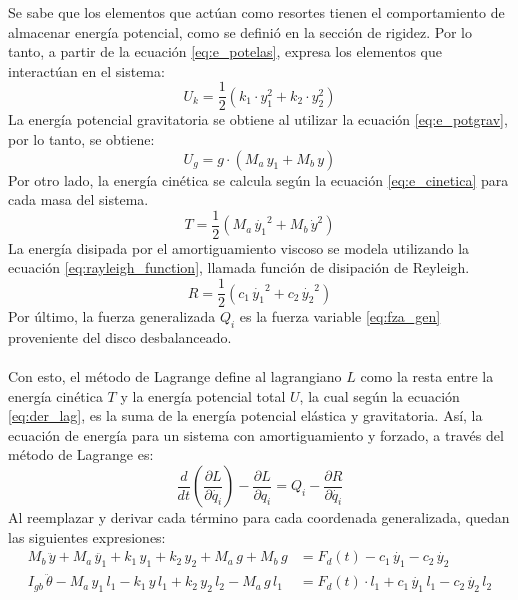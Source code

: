 Se sabe que los elementos que actúan como resortes tienen el comportamiento de almacenar energía potencial, como se definió en la sección de rigidez. Por lo tanto, a partir de la ecuación \ref{eq:e_potelas}, expresa los elementos que interactúan en el sistema:
\begin{equation}
	U_k = \frac{1}{2} \left(k_1\cdot y_1^2 + k_2\cdot y_2^2\right)
\end{equation}
La energía potencial gravitatoria se obtiene al utilizar la ecuación \ref{eq:e_potgrav}, por lo tanto, se obtiene:
\begin{equation}
	U_g = g\cdot \left(M_a\, y_1 + M_b\, y\right)
\end{equation}
Por otro lado, la energía cinética se calcula según la ecuación \ref{eq:e_cinetica} para cada masa del sistema.
\begin{equation}
	T = \frac{1}{2} \left(M_a\, \dot{y_1}^2 + M_b\, \dot{y}^2\right)
\end{equation}
La energía disipada por el amortiguamiento viscoso se modela utilizando la ecuación \ref{eq:rayleigh_function}, llamada función de disipación de Reyleigh. 
\begin{equation}
	R = \frac{1}{2} \left(c_1\, \dot{y_1}^2 + c_2\, \dot{y_2}^2\right)
\end{equation}
Por último, la fuerza generalizada $Q_i$ es la fuerza variable \ref{eq:fza_gen} proveniente del disco desbalanceado.\\ \\
Con esto, el método de Lagrange define al lagrangiano $L$ como la resta entre la energía cinética $T$ y la energía potencial total $U$, la cual según la ecuación \ref{eq:der_lag}, es la suma de la energía potencial elástica y gravitatoria. Así, la ecuación de energía para un sistema con amortiguamiento y forzado, a través del método de Lagrange es:
\begin{equation}
	\frac{d}{dt}\left(\frac{\partial L}{\partial \dot{q_i}}\right) - \frac{\partial L}{\partial q_i} = Q_i - \frac{\partial R}{\partial \dot{q_i}}
\end{equation}
Al reemplazar y derivar cada término para cada coordenada generalizada, quedan las siguientes expresiones:
\begin{subequations}
\begin{align}
	M_b\, \ddot{y} + M_a\, \ddot{y_1} + k_1\, y_1 + k_2\, y_2 + M_a\, g + M_b\, g &= F_d(t) - c_1\, \dot{y_1} - c_2\, \dot{y_2} \\
	I_{gb}\, \ddot{\theta} - M_a\, y_1\, l_1 - k_1\, y\, l_1 + k_2\, y_2\, l_2 - M_a\, g\, l_1 &= F_d(t)\cdot l_1 + c_1\, \dot{y_1}\, l_1 - c_2\, \dot{y_2}\, l_2 
\end{align}
\end{subequations}

